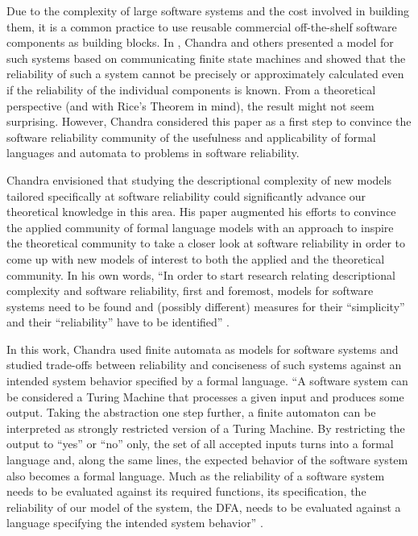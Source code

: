 \documentclass[copyright]{eptcs}
\begin{document}
Due to the complexity of large software systems and the cost involved
in building them, it is a common practice to use reusable commercial
off-the-shelf software components as building blocks.  In
\cite{KappesKK00}, Chandra and others presented a model for such systems
based on communicating finite state machines and showed that the
reliability of such a system cannot be precisely or approximately
calculated even if the reliability of the individual components is
known.  From a theoretical perspective (and with Rice's Theorem in
mind), the result might not seem surprising. However, Chandra considered
this paper as a first step to convince the software reliability
community of the usefulness and applicability of formal languages and
automata to problems in software reliability.

Chandra envisioned that studying the descriptional complexity of
new models tailored specifically at
software reliability could significantly advance our theoretical
knowledge in this area. His paper \cite{KappesK04} augmented his
efforts to convince the applied community of formal language models
with an approach to inspire the theoretical community to take a closer
look at software reliability in order to come up with new models of
interest to both the applied and the theoretical community. In his own
words,
``In order to start research relating descriptional complexity and
software reliability, first and foremost, models for software systems
need to be found and (possibly different) measures for their
``simplicity'' and their ``reliability'' have to be identified''
\cite{KappesK04}.

In this work, Chandra used finite automata as models for software
systems and studied trade-offs between reliability and conciseness of
such systems against an intended system behavior specified by a formal
language. ``A software system can be
considered a Turing Machine that processes a given input and produces
some output. Taking the abstraction one step further, a finite
automaton can be interpreted as strongly restricted version of a Turing
Machine. By restricting the output to ``yes'' or ``no'' only, the set
of all accepted inputs turns into a formal language and, along the
same lines, the expected behavior of the software system also becomes
a formal language. Much as the reliability of a software system needs
to be evaluated against its required functions, its specification, the
reliability of our model of the system, the DFA, needs to be evaluated
against a language specifying the intended system behavior''
\cite{KappesK04}.
\end{document}
